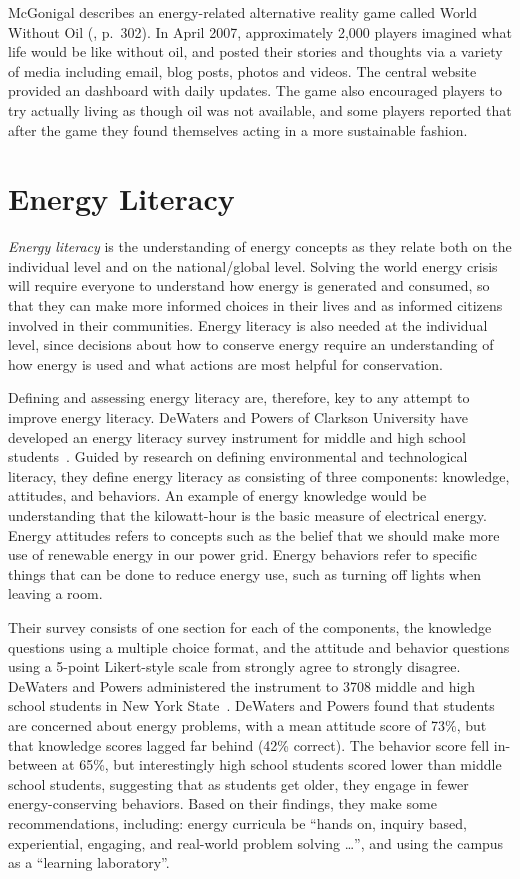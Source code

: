 McGonigal describes an energy-related alternative reality game called World Without Oil (\cite{mcgonigal2011reality}, p.\ 302). In April 2007, approximately 2,000 players imagined what life would be like without oil, and posted their stories and thoughts via a variety of media including email, blog posts, photos and videos. The central website~\cite{worldwithoutoil} provided an dashboard with daily updates. The game also encouraged players to try actually living as though oil was not available, and some players reported that after the game they found themselves acting in a more sustainable fashion.


\section{Energy Literacy}
\label{sec:energy-literacy}

\emph{Energy literacy} is the understanding of energy concepts as they relate both on the individual level and on the national/global level. Solving the world energy crisis will require everyone to understand how energy is generated and consumed, so that they can make more informed choices in their lives and as informed citizens involved in their communities. Energy literacy is also needed at the individual level, since decisions about how to conserve energy require an understanding of how energy is used and what actions are most helpful for conservation.

Defining and assessing energy literacy are, therefore, key to any attempt to improve energy literacy. DeWaters and Powers of Clarkson University have developed an energy literacy survey instrument for middle and high school students~\cite{DeWaters2007,DeWaters2008}. Guided by research on defining environmental and technological literacy, they define energy literacy as consisting of three components: knowledge, attitudes, and behaviors. An example of energy knowledge would be understanding that the kilowatt-hour is the basic measure of electrical energy. Energy attitudes refers to concepts such as the belief that we should make more use of renewable energy in our power grid. Energy behaviors refer to specific things that can be done to reduce energy use, such as turning off lights when leaving a room.

Their survey consists of one section for each of the components, the knowledge questions using a multiple choice format, and the attitude and behavior questions using a 5-point Likert-style scale from strongly agree to strongly disagree. DeWaters and Powers administered the instrument to 3708 middle and high school students in New York State~\cite{DeWaters2011}. DeWaters and Powers found that students are concerned about energy problems, with a mean attitude score of 73\%, but that knowledge scores lagged far behind (42\% correct). The behavior score fell in-between at 65\%, but interestingly high school students scored lower than middle school students, suggesting that as students get older, they engage in fewer energy-conserving behaviors. Based on their findings, they make some recommendations, including: energy curricula be ``hands on, inquiry based, experiential, engaging, and real-world problem solving \ldots'', and using the campus as a ``learning laboratory''.

